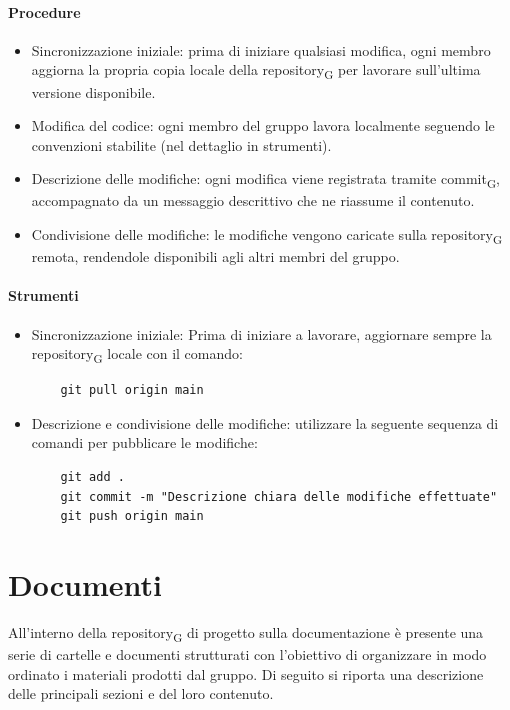\documentclass[11pt,a4paper]{article}
\newcommand{\gls}[1]{#1\textsubscript{G}}
\begin{document}
\paragraph{Procedure}
\begin{itemize}
\item Sincronizzazione iniziale: prima di iniziare qualsiasi modifica, ogni membro aggiorna la propria copia locale della \gls{repository} per lavorare sull’ultima versione disponibile.
\item Modifica del codice: ogni membro del gruppo lavora localmente seguendo le convenzioni stabilite (nel dettaglio in strumenti).
\item Descrizione delle modifiche: ogni modifica viene registrata tramite \gls{commit}, accompagnato da un messaggio descrittivo che ne riassume il contenuto.
\item Condivisione delle modifiche: le modifiche vengono caricate sulla \gls{repository} remota, rendendole disponibili agli altri membri del gruppo.
\end{itemize}

\paragraph{Strumenti}
\begin{itemize}
\item Sincronizzazione iniziale: Prima di iniziare a lavorare, aggiornare sempre la \gls{repository} locale con il comando:
    \begin{verbatim}
    git pull origin main
    \end{verbatim}
\item Descrizione e condivisione delle modifiche: utilizzare la seguente sequenza di comandi per pubblicare le modifiche:
    \begin{verbatim}
    git add .
    git commit -m "Descrizione chiara delle modifiche effettuate"
    git push origin main
    \end{verbatim}
\end{itemize}


\newpage

\section{Documenti}
All’interno della \gls{repository} di progetto sulla documentazione è presente una serie di cartelle e documenti strutturati con l’obiettivo di organizzare in modo ordinato i materiali prodotti dal gruppo. Di seguito si riporta una descrizione delle principali sezioni e del loro contenuto.
\end{document}
